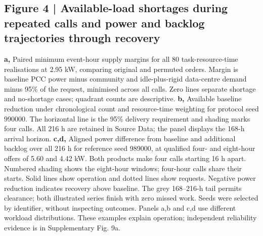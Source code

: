 \documentclass[10pt,a4paper]{article}
\begin{document}
\begin{minipage}{\textwidth}
\subsection*{Figure 4 | Available-load shortages during repeated calls and power and backlog trajectories through recovery}

\textbf{a,} Paired minimum event-hour supply margins for all 80 task-resource-time realisations at 2.95 kW, comparing original and permuted orders. Margin is baseline PCC power minus community and idle-plus-rigid data-centre demand minus 95\% of the request, minimised across all calls. Zero lines separate shortage and no-shortage cases; quadrant counts are descriptive. \textbf{b,} Available baseline reduction under chronological count and resource-time weighting for protocol seed 990000. The horizontal line is the 95\% delivery requirement and shading marks four calls. All 216 h are retained in Source Data; the panel displays the 168-h arrival horizon. \textbf{c,d,} Aligned power difference from baseline and additional backlog over all 216 h for reference seed 989000, at qualified four- and eight-hour offers of 5.60 and 4.42 kW. Both products make four calls starting 16 h apart. Numbered shading shows the eight-hour windows; four-hour calls share their starts. Solid lines show operation and dotted lines show requests. Negative power reduction indicates recovery above baseline. The grey 168–216-h tail permits clearance; both illustrated series finish with zero missed work. Seeds were selected by identifier, without inspecting outcomes. Panels a,b and c,d use different workload distributions. These examples explain operation; independent reliability evidence is in Supplementary Fig. 9a.
\end{minipage}\par\vspace{7pt}
\end{document}
